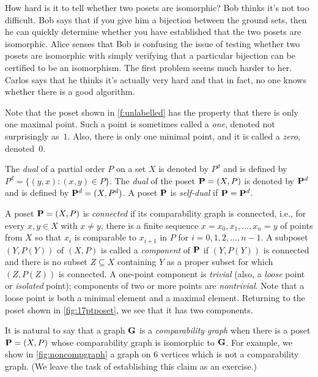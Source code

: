 \begin{remark}
How hard is it to tell whether two posets are isomorphic?  Bob thinks
it's not too difficult.  Bob says that if you give him a bijection between
the ground sets, then he can quickly determine whether you have
established that the two posets are isomorphic.  Alice senses that
Bob is confusing the issue of testing whether two posets are isomorphic
with simply verifying that a particular bijection can be certified to
be an isomorphism.  The first problem seems much harder to her. Carlos says that he
thinks it's actually very hard and that in fact, no one knows whether there is
a good algorithm.  
\end{remark}

Note that the poset shown in \autoref{f:unlabelled} has the property
that there is only one maximal point.  Such a point is sometimes
called a \textit{one}, denoted not surprisingly as~$1$.  Also, there
is only one minimal point, and it is called a \textit{zero},
denoted~$0$.

The \textit{dual} of a partial order $P$ on a set $X$ is denoted by
$P^d$ and is defined by $P^d=\{(y,x):(x,y)\in P\}$. The \textit{dual}
of the poset $\mathbf{P}=(X,P)$ is denoted by $\mathbf{P}^d$ and is defined by
$\mathbf{P}^d=(X,P^d)$. A poset $\mathbf{P}$ is \textit{self-dual} if
$\mathbf{P}=\mathbf{P}^d$.

A poset $\mathbf{P}=(X,P)$ is \textit{connected} if its comparability graph is 
connected, i.e., for every $x,y\in X$ with
$x\ne y$, there is a finite sequence $x=x_0,x_1,\dots,x_n=y$ of points
from $X$ so that $x_i$ is comparable to $x_{i+1}$ in $P$ for
$i=0,1,2,\dots,n-1$. A subposet $(Y,P(Y))$ of $(X,P)$ is called a
\textit{component} of $\mathbf{P}$ if $(Y,P(Y))$ is connected and there is
no subset $Z\subseteq X$ containing $Y$ as a proper subset for which
$(Z,P(Z))$ is connected.  A one-point component is \textit{trivial}
(also, a \textit{loose} point or \textit{isolated} point); components
of two or more points are \textit{nontrivial}.  Note that a loose
point is both a minimal element and a maximal element.  Returning to
the poset shown in \autoref{fig:17ptposet}, we see that it has two
components.

It is natural to say that a graph $\mathbf{G}$ is a \emph{comparability graph}
when there is a poset $\mathbf{P}=(X,P)$ whose comparability graph is isomorphic
to $\mathbf{G}$.  For example, we show in \autoref{fig:noncompgraph} a graph on
$6$ vertices which is not a comparability graph. (We leave the task of
establishing this claim as an exercise.)

